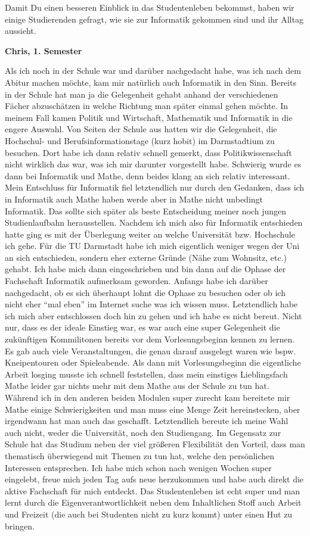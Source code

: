 {Damit Du einen besseren Einblick in das Studentenleben bekommst, haben wir einige Studierenden gefragt, wie sie zur Informatik gekommen sind und ihr Alltag aussieht.%
}
{\textbf{Chris, 1. Semester}

    Als ich noch in der Schule war und darüber nachgedacht habe, was ich nach dem Abitur machen möchte, kam mir natürlich auch Informatik in den Sinn. Bereits in der Schule hat man ja die Gelegenheit gehabt anhand der verschiedenen Fächer abzuschätzen in welche Richtung man später einmal gehen möchte. In meinem Fall kamen Politik und Wirtschaft, Mathematik und Informatik in die engere Auswahl. Von Seiten der Schule aus hatten wir die Gelegenheit, die Hochschul- und Berufsinformationstage (kurz hobit) im Darmstadtium zu besuchen. Dort habe ich dann relativ schnell gemerkt, dass Politikwissenschaft nicht wirklich das war, was ich mir darunter vorgestellt habe. Schwierig wurde es dann bei Informatik und Mathe, denn beides klang an sich relativ interessant. Mein Entschluss für Informatik fiel letztendlich nur durch den Gedanken, dass ich in Informatik auch Mathe haben werde aber in Mathe nicht unbedingt Informatik. Das sollte sich später als beste Entscheidung meiner noch jungen Studienlaufbahn herausstellen. Nachdem ich mich also für Informatik entschieden hatte ging es mit der Überlegung weiter an welche Universität bzw. Hochschule ich gehe. Für die TU Darmstadt habe ich mich eigentlich weniger wegen der Uni an sich entschieden, sondern eher externe Gründe (Nähe zum Wohnsitz, etc.) gehabt. Ich habe mich dann eingeschrieben und bin dann auf die Ophase der Fachschaft Informatik aufmerksam geworden. Anfangs habe ich darüber nachgedacht, ob es sich überhaupt lohnt die Ophase zu besuchen oder ob ich nicht eher "`mal eben"' im Internet suche was ich wissen muss. Letztendlich habe ich mich aber entschlossen doch hin zu gehen und ich habe es nicht bereut. Nicht nur, dass es der ideale Einstieg war, es war auch eine super Gelegenheit die zukünftigen Kommilitonen bereits vor dem Vorlesungsbeginn kennen zu lernen. Es gab auch viele Veranstaltungen, die genau darauf ausgelegt waren wie bspw. Kneipentouren oder Spieleabende. Als dann mit Vorlesungsbeginn die eigentliche Arbeit losging musste ich schnell feststellen, dass mein einstiges Lieblingsfach Mathe leider gar nichts mehr mit dem Mathe aus der Schule zu tun hat. Während ich in den anderen beiden Modulen super zurecht kam bereitete mir Mathe einige Schwierigkeiten und man muss eine Menge Zeit hereinstecken, aber irgendwann hat man auch das geschafft. Letztendlich bereute ich meine Wahl auch nicht, weder die Universität, noch den Studiengang. Im Gegensatz zur Schule hat das Studium neben der viel größeren Flexibilität den Vorteil, dass man thematisch überwiegend mit Themen zu tun hat, welche den persönlichen Interessen entsprechen. Ich habe mich schon nach wenigen Wochen super eingelebt, freue mich jeden Tag aufs neue herzukommen und habe auch direkt die aktive Fachschaft für mich entdeckt. Das Studentenleben ist echt super und man lernt durch die Eigenverantwortlichkeit neben dem Inhaltlichen Stoff auch Arbeit und Freizeit (die auch bei Studenten nicht zu kurz kommt) unter einen Hut zu bringen.\\

}
